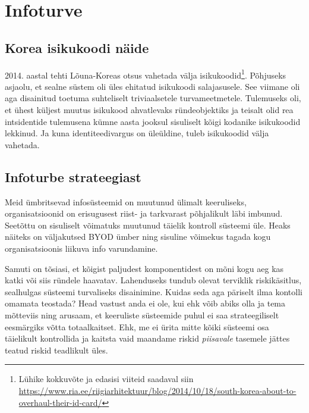 \chapter{Infoturve}

\section{Korea isikukoodi näide}
2014. aastal tehti Lõuna-Koreas otsus vahetada välja isikukoodid\footnote{Lühike kokkuvõte ja edasisi viiteid saadaval siin \url{https://www.ria.ee/riigiarhitektuur/blog/2014/10/18/south-korea-about-to-overhaul-their-id-card/}}. Põhjuseks asjaolu, et sealne süstem oli üles ehitatud isikukoodi salajasusele. See viimane oli aga disainitud toetuma suhteliselt triviaalsetele turvameetmetele. Tulemuseks oli, et ühest küljest muutus isikukood ahvatlevaks ründeobjektiks ja teisalt olid rea intsidentide tulemusena kümne aasta jooksul sisuliselt kõigi kodanike isikukoodid lekkinud. Ja kuna identiteedivargus on üleüldine, tuleb isikukoodid välja vahetada.

\section{Infoturbe strateegiast}
Meid ümbritsevad infosüsteemid on muutunud ülimalt keeruliseks, organisatsioonid on erisugusest riist- ja tarkvarast põhjalikult läbi imbunud. Seetõttu on sisuliselt võimatuks muutunud täielik kontroll süsteemi üle. Heaks näiteks on väljakutsed BYOD ümber ning sisuline võimekus tagada kogu organisatsioonis liikuva info varundamine. 

Samuti on tõsiasi, et kõigist paljudest komponentidest on mõni kogu aeg kas katki või siis ründele haavatav. Lahenduseks tundub olevat terviklik riskikäsitlus, sealhulgas süsteemi turvaliseks disainimine. Kuidas seda aga päriselt ilma kontolli omamata teostada? Head vastust anda ei ole, kui ehk võib abiks olla \citeauthor{leveson2011engineering}\cite{leveson2011engineering} ja tema mõtteviis ning arusaam, et keeruliste süsteemide puhul ei saa strateegiliselt eesmärgiks võtta totaalkaitset. Ehk, me ei ürita mitte kõiki süsteemi osa täielikult kontrollida ja kaitsta vaid maandame riskid \emph{piisavale} tasemele jättes teatud riskid teadlikult üles. 

